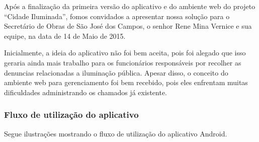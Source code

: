 \documentclass[
	article,			%
	11pt,				%
	oneside,			%
	a4paper,			%
	english,			%
	brazil,				%
	sumario=tradicional
	]{abntex2}
\begin{document}
Após a finalização da primeira versão do aplicativo e do ambiente web do
projeto “Cidade Iluminada”, fomos convidados a apresentar nossa solução para o
Secretário de Obras de São José dos Campos, o senhor Rene Mina Vernice e sua
equipe, na data de 14 de Maio de 2015.

Inicialmente, a ideia do aplicativo não foi bem aceita, pois foi alegado que
isso geraria ainda mais trabalho para os funcionários responsáveis por
recolher as denuncias relacionadas a iluminação pública. Apesar disso, o
conceito do ambiente web para gerenciamento foi bem recebido, pois eles
enfrentam muitas dificuldades administrando os chamados já existente.

\subsubsection{Fluxo de utilização do aplicativo}

Segue ilustrações mostrando o fluxo de utilização do aplicativo Android.
\end{document}
